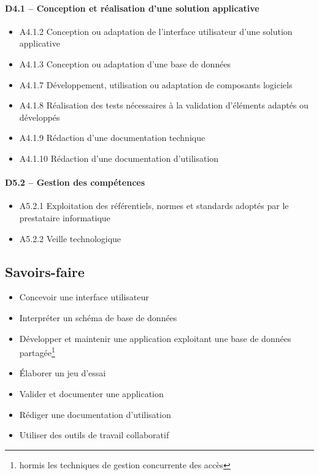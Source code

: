 \documentclass[12pt,a4paper,oneside,titlepage,final]{article}
\begin{document}
\paragraph{D4.1 -- Conception et réalisation d'une solution
  applicative}
\begin{itemize}
    \item A4.1.2 Conception ou adaptation de l'interface utilisateur
    d'une solution applicative
    \item A4.1.3 Conception ou adaptation d'une base de données
    \item A4.1.7 Développement, utilisation ou adaptation de
    composants logiciels
    \item A4.1.8 Réalisation des tests nécessaires à la validation
    d'éléments adaptés ou développés
    \item A4.1.9 Rédaction d'une documentation technique
    \item A4.1.10 Rédaction d'une documentation d'utilisation
\end{itemize}

\paragraph{D5.2 -- Gestion des compétences}
\begin{itemize}
    \item A5.2.1 Exploitation des référentiels, normes et standards
    adoptés par le prestataire informatique
    \item A5.2.2 Veille technologique
\end{itemize}

\subsection*{Savoirs-faire}
\begin{itemize}
    \item Concevoir une interface utilisateur
    \item Interpréter un schéma de base de données
    \item Développer et maintenir une application exploitant une base
    de données partagée\footnote{hormis les techniques de gestion
      concurrente des accès}
    \item Élaborer un jeu d'essai
    \item Valider et documenter une application
    \item Rédiger une documentation d'utilisation
    \item Utiliser des outils de travail collaboratif
\end{itemize}
\end{document}
